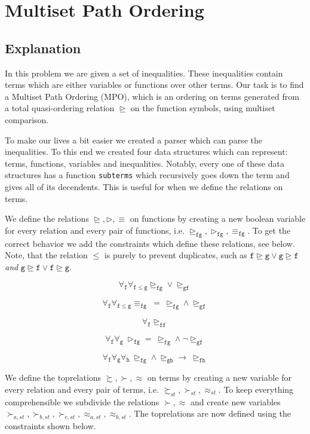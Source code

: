 \documentclass{scrartcl}
\begin{document}
\pagebreak
\section{Multiset Path Ordering}
\subsection{Explanation}
In this problem we are given a set of inequalities. These inequalities contain
terms which are either variables or functions over other terms. Our task is to
find a Multiset Path Ordering (MPO), which is an ordering on terms generated
from a total quasi-ordering relation $\trianglerighteq$ on the function
symbols, using multiset comparison.

To make our lives a bit easier we created a parser which can parse the
inequalities. To this end we created four data structures which can represent:
terms, functions, variables and inequalities. Notably, every one of these data
structures has a function \texttt{subterms} which recursively goes down the
term and gives all of its decendents. This is useful for when we define the
relations on terms.

We define the relations $\trianglerighteq, \rhd, \equiv$ on functions by
creating a new boolean variable for every relation and every pair of functions,
i.e. $\mathtt{\trianglerighteq_{fg}, \rhd_{fg}, \equiv_{fg}}$. To get the
correct behavior we add the constraints which define these relations, see
below. Note, that the relation $\leq$ is purely to prevent duplicates, such as
$\mathtt{f \trianglerighteq g \lor g \trianglerighteq f}$ \textit{and}
$\mathtt{g \trianglerighteq f \lor f \trianglerighteq g}$.

$$\mathtt{\forall_f \forall_{f \leq g} \trianglerighteq_{fg} \lor
\trianglerighteq_{gf}}$$

$$\mathtt{\forall_f \forall_{f \leq g} \equiv_{fg}\ =\ \trianglerighteq_{fg}
\land \trianglerighteq_{gf}}$$

$$\mathtt{\forall_f \trianglerighteq_{ff}}$$

$$\mathtt{\forall_f \forall_{g}\ \rhd_{fg} =\
\trianglerighteq_{fg} \land \neg \trianglerighteq_{gf}}$$

$$\mathtt{\forall_f \forall_{g} \forall_{h}\ \trianglerighteq_{fg} \land
\trianglerighteq_{gh} \to\ \trianglerighteq_{fh}}$$

We define the toprelations $\succsim, \succ, \approx$ on terms by creating a new
variable for every relation and every pair of terms, i.e. $\succsim_{st},
\succ_{st}, \approx_{st}$. To keep everything comprehensible we subdivide the
relations $\succ, \approx$ and create new variables $\succ_{a,st},
\succ_{b,st}, \succ_{c,st}, \approx_{a,st}, \approx_{b,st}$. The toprelations
are now defined using the constraints shown below.
\end{document}
